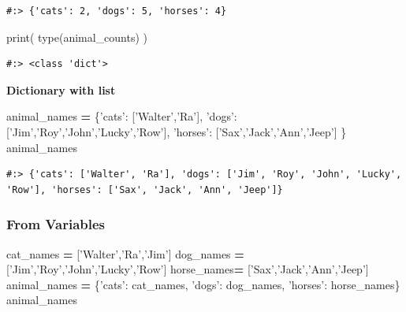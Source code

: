 \documentclass[
]{book}
\newenvironment{Shaded}{\begin{snugshade}}{\end{snugshade}}
\newcommand{\BuiltInTok}[1]{#1}
\newcommand{\NormalTok}[1]{#1}
\newcommand{\OperatorTok}[1]{\textcolor[rgb]{0.43,0.43,0.43}{\textbf{#1}}}
\newcommand{\StringTok}[1]{\textcolor[rgb]{0.5,0.5,0.5}{#1}}
\begin{document}
\begin{verbatim}
#:> {'cats': 2, 'dogs': 5, 'horses': 4}
\end{verbatim}

\begin{Shaded}
\begin{Highlighting}[]
\BuiltInTok{print}\NormalTok{( }\BuiltInTok{type}\NormalTok{(animal_counts) )}
\end{Highlighting}
\end{Shaded}

\begin{verbatim}
#:> <class 'dict'>
\end{verbatim}

\textbf{Dictionary with list}

\begin{Shaded}
\begin{Highlighting}[]
\NormalTok{animal_names }\OperatorTok{=}\NormalTok{ \{}\StringTok{'cats'}\NormalTok{:   [}\StringTok{'Walter'}\NormalTok{,}\StringTok{'Ra'}\NormalTok{],}
                \StringTok{'dogs'}\NormalTok{:   [}\StringTok{'Jim'}\NormalTok{,}\StringTok{'Roy'}\NormalTok{,}\StringTok{'John'}\NormalTok{,}\StringTok{'Lucky'}\NormalTok{,}\StringTok{'Row'}\NormalTok{],}
                \StringTok{'horses'}\NormalTok{: [}\StringTok{'Sax'}\NormalTok{,}\StringTok{'Jack'}\NormalTok{,}\StringTok{'Ann'}\NormalTok{,}\StringTok{'Jeep'}\NormalTok{]}
\NormalTok{               \}}
\NormalTok{animal_names}
\end{Highlighting}
\end{Shaded}

\begin{verbatim}
#:> {'cats': ['Walter', 'Ra'], 'dogs': ['Jim', 'Roy', 'John', 'Lucky', 'Row'], 'horses': ['Sax', 'Jack', 'Ann', 'Jeep']}
\end{verbatim}

\hypertarget{from-variables}{%
\subsubsection{From Variables}\label{from-variables}}

\begin{Shaded}
\begin{Highlighting}[]
\NormalTok{cat_names }\OperatorTok{=}\NormalTok{ [}\StringTok{'Walter'}\NormalTok{,}\StringTok{'Ra'}\NormalTok{,}\StringTok{'Jim'}\NormalTok{]}
\NormalTok{dog_names }\OperatorTok{=}\NormalTok{ [}\StringTok{'Jim'}\NormalTok{,}\StringTok{'Roy'}\NormalTok{,}\StringTok{'John'}\NormalTok{,}\StringTok{'Lucky'}\NormalTok{,}\StringTok{'Row'}\NormalTok{]}
\NormalTok{horse_names}\OperatorTok{=}\NormalTok{ [}\StringTok{'Sax'}\NormalTok{,}\StringTok{'Jack'}\NormalTok{,}\StringTok{'Ann'}\NormalTok{,}\StringTok{'Jeep'}\NormalTok{]}
\NormalTok{animal_names }\OperatorTok{=}\NormalTok{ \{}\StringTok{'cats'}\NormalTok{: cat_names, }\StringTok{'dogs'}\NormalTok{: dog_names, }\StringTok{'horses'}\NormalTok{: horse_names\}}
\NormalTok{animal_names}
\end{Highlighting}
\end{Shaded}
\end{document}
